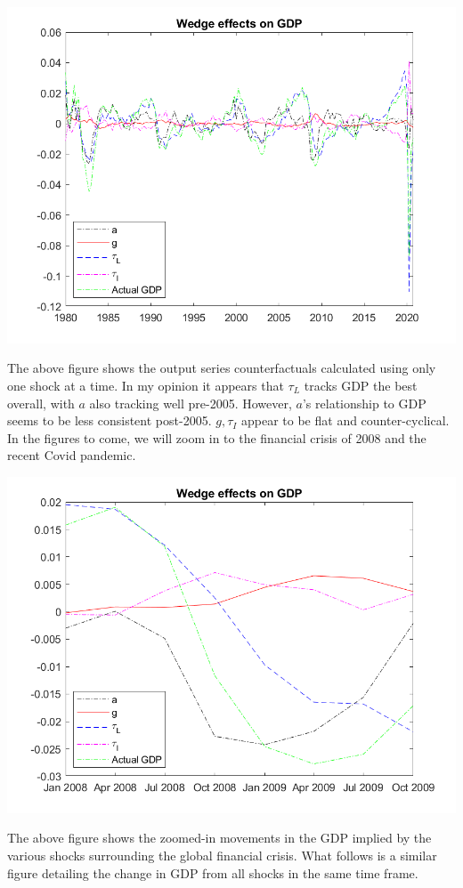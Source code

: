 \documentclass[11pt]{article} %
\begin{document}
\includegraphics{wedgesg}

The above figure shows the output series counterfactuals calculated using only one shock at a time. In my opinion it appears that $\tau_L$ tracks GDP the best overall, with $a$ also tracking well pre-2005. However, $a$'s relationship to GDP seems to be less consistent post-2005. $g,\tau_{I}$ appear to be flat and counter-cyclical. In the figures to come, we will zoom in to the financial crisis of 2008 and the recent Covid pandemic.

\includegraphics{wedgesfin}

The above figure shows the zoomed-in movements in the GDP implied by the various shocks surrounding the global financial crisis. What follows is a similar figure detailing the change in GDP from all shocks in the same time frame.
\end{document}
